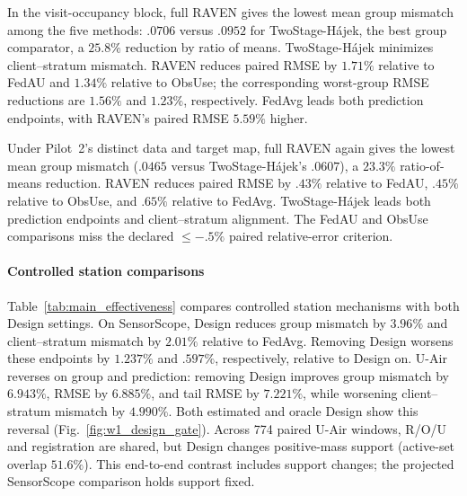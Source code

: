 \documentclass[letterpaper,journal]{IEEEtran}
\begin{document}
In the visit-occupancy block, full RAVEN gives the lowest mean group
mismatch among the five methods: $.0706$ versus $.0952$ for TwoStage-H\'ajek,
the best group comparator, a $25.8\%$ reduction by ratio of means. TwoStage-H\'ajek minimizes
client--stratum mismatch. RAVEN reduces paired RMSE by $1.71\%$ relative to FedAU and $1.34\%$ relative
to ObsUse; the corresponding worst-group RMSE reductions are $1.56\%$ and
$1.23\%$, respectively. FedAvg leads both prediction endpoints,
with RAVEN's paired RMSE $5.59\%$ higher.

Under Pilot~2's distinct data and target map, full RAVEN again gives the lowest
mean group mismatch ($.0465$ versus TwoStage-H\'ajek's $.0607$), a
$23.3\%$ ratio-of-means reduction. RAVEN reduces paired RMSE by $.43\%$ relative to FedAU, $.45\%$ relative to
ObsUse, and $.65\%$ relative to FedAvg. TwoStage-H\'ajek leads both prediction
endpoints and client--stratum alignment. The FedAU and ObsUse comparisons
miss the declared $\le-.5\%$ paired relative-error criterion.


\paragraph{Controlled station comparisons}


Table~\ref{tab:main_effectiveness} compares controlled station mechanisms with both Design settings.  On SensorScope,
Design reduces group mismatch by $3.96\%$ and client--stratum mismatch by
$2.01\%$ relative to FedAvg. Removing Design worsens these endpoints by
$1.237\%$ and $.597\%$, respectively, relative to Design on.
U-Air reverses on group and prediction: removing Design improves group
mismatch by $6.943\%$, RMSE by $6.885\%$, and tail RMSE by $7.221\%$, while
worsening client--stratum mismatch by $4.990\%$. Both estimated and oracle
Design show this reversal (Fig.~\ref{fig:w1_design_gate}).
Across 774 paired U-Air windows, R/O/U and registration are shared, but
Design changes positive-mass support (active-set overlap $51.6\%$).
This end-to-end contrast includes support changes;
the projected SensorScope comparison holds support fixed.
\end{document}
